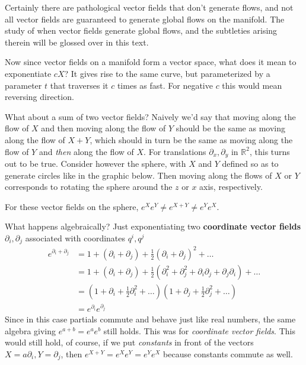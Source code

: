\documentclass[../master.tex]{subfiles}
\begin{document}
		\begin{nb}
			Certainly there are pathological vector fields that don't generate flows, and not all vector fields are guaranteed to generate global flows on the manifold. The study of when vector fields generate global flows, and the subtleties arising therein will be glossed over in this text.
		\end{nb}
		
		Now since vector fields on a manifold form a vector space, what does it mean to exponentiate $c X$? It gives rise to the same curve, but parameterized by a parameter $t$ that traverses it $c$ times as fast. For negative $c$ this would mean reversing direction. 
		
		What about a sum of two vector fields? Naively we'd say that moving along the flow of $X$ and then moving along the flow of $Y$ should be the same as moving along the flow of $X+Y$, which should in turn be the same as moving along the flow of $Y$ and \emph{then} along the flow of $X$. For translations $\partial_x, \partial_y$ in $\mathbb R^2$, this turns out to be true. Consider however the sphere, with $X$ and $Y$ defined so as to generate circles like in the graphic below. Then moving along the flows of $X$ or $Y$ corresponds to rotating the sphere around the $z$ or $x$ axis, respectively. 
		
		
		For these vector fields on the sphere, $e^{X}e^{Y}\neq e^{X+Y} \neq e^Y e^X$. 
		
		What happens algebraically? Just exponentiating two \textbf{coordinate vector fields} $\partial_i, \partial_j$ associated with coordinates $q^i, q^j$
		\begin{align*}
			e^{\partial_i + \partial_j} &= 1 + (\partial_i + \partial_j) + \frac{1}{2}(\partial_i + \partial_j)^2 + \dots\\
			&= 1 + (\partial_i + \partial_j) + \frac{1}{2}(\partial_i^2 + \partial^2_j + \partial_i \partial_j + \partial_j \partial_i) + \dots\\
			&= (1+\partial_i + \frac{1}{2}\partial_i^2+\dots)(1+\partial_j + \frac{1}{2} \partial_j^2+\dots)\\
			&= e^{\partial_i} e^{\partial_j}
		\end{align*}
		Since in this case partials commute and behave just like real numbers, the same algebra giving $e^{a+b} = e^a e^b$ still holds. This was for \emph{coordinate vector fields}. This would still hold, of course, if we put \emph{constants} in front of the vectors $X = a \partial_i, Y=\partial_j$, then $e^{X+Y}=e^X e^Y = e^Y e^X$ because constants commute as well. 
		
\end{document}
